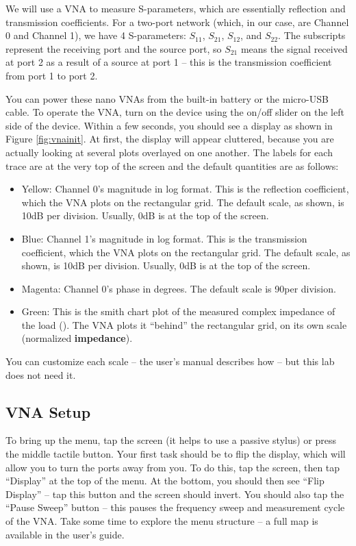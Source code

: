 \documentclass{exam}
\begin{document}
We will use a VNA to measure S-parameters, which are essentially reflection and transmission coefficients. For a two-port network (which, in our case, are Channel 0 and Channel 1), we have 4 S-parameters: $S_{11}$, $S_{21}$, $S_{12}$, and $S_{22}$. The subscripts represent the receiving port and the source port, so $S_{21}$ means the signal received at port 2 as a result of a source at port 1 -- this is the transmission coefficient from port 1 to port 2.

You can power these nano VNAs from the built-in battery or the micro-USB cable. To operate the VNA, turn on the device using the on/off slider on the left side of the device. Within a few seconds, you should see a display as shown in Figure \ref{fig:vnainit}. At first, the display will appear cluttered, because you are actually looking at several plots overlayed on one another. The labels for each trace are at the very top of the screen and the default quantities are as follows:

\begin{itemize}

\item Yellow: Channel 0's magnitude in log format. This is the reflection coefficient, which the VNA plots on the rectangular grid. The default scale, as shown, is 10dB per division. Usually, 0dB is at the top of the screen.
\item Blue: Channel 1's magnitude in log format. This is the transmission coefficient, which the VNA plots on the rectangular grid.  The default scale, as shown, is 10dB per division.  Usually, 0dB is at the top of the screen.
\item Magenta: Channel 0's phase in degrees. The default scale is 90\mydeg per division.
\item Green: This is the smith chart plot of the measured complex impedance of the load (). The VNA plots it ``behind'' the rectangular grid, on its own scale (normalized \textbf{impedance}).

\end{itemize}

You can customize each scale -- the user's manual describes how -- but this lab does not need it.

\subsection{VNA Setup}
To bring up the menu, tap the screen (it helps to use a passive stylus) or press the middle tactile button. Your first task should be to flip the display, which will allow you to turn the ports away from you. To do this, tap the screen, then tap ``Display'' at the top of the menu. At the bottom, you should then see ``Flip Display'' -- tap this button and the screen should invert. You should also tap the ``Pause Sweep'' button -- this pauses the frequency sweep and measurement cycle of the VNA.  Take some time to explore the menu structure -- a full map is available in the user's guide.
\end{document}
